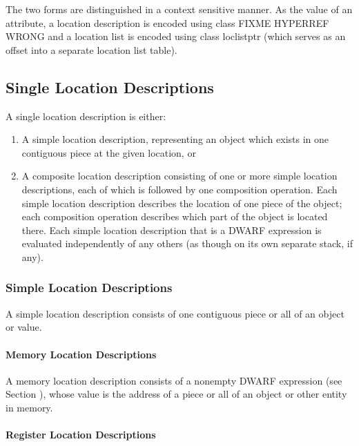 The two forms are distinguished in a context sensitive
manner. As the value of an attribute, a location description
is encoded using class   
FIXME HYPERREF WRONG
and a location list is encoded
using class loclistptr (which serves as an offset into a
separate location list table).


\subsection{Single Location Descriptions}
A single location description is either:

\begin{enumerate}[1]
\item A simple location description, representing an object
which exists in one contiguous piece at the given location, or 
\item A composite location description consisting of one or more
simple location descriptions, each of which is followed by
one composition operation. Each simple location description
describes the location of one piece of the object; each
composition operation describes which part of the object is
located there. Each simple location description that is a
DWARF expression is evaluated independently of any others
(as though on its own separate stack, if any). 
\end{enumerate}



\subsubsection{Simple Location Descriptions}

A simple location description consists of one 
contiguous piece or all of an object or value.


\paragraph{Memory Location Descriptions}

A memory location description consists of a non\dash empty DWARF
expression (see 
Section 
), whose value is the address of
a piece or all of an object or other entity in memory.

\paragraph{Register Location Descriptions}

